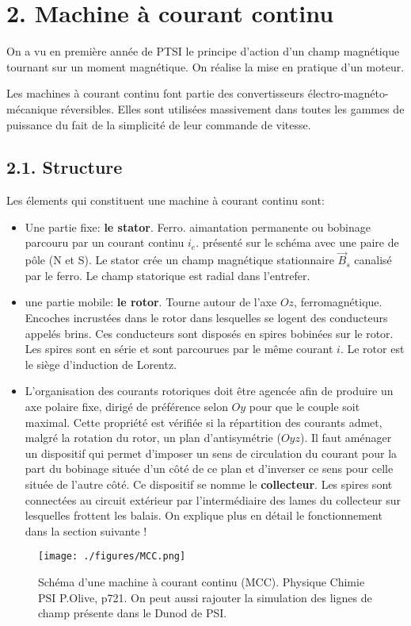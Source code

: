 \documentclass[french, a4paper, 10pt, twocolumn, landscape]{article}
\begin{document}
\section*{2. Machine à courant continu}
On a vu en première année de PTSI le principe d'action d'un champ magnétique tournant sur un moment magnétique. On réalise la mise en pratique d'un moteur.\medskip

Les machines à courant continu font partie des convertisseurs électro-magnéto-mécanique réversibles. Elles sont utilisées massivement dans toutes les gammes de puissance du fait de la simplicité de leur commande de vitesse.

\subsection*{2.1. Structure}

Les élements qui constituent une machine à courant continu sont: 
\begin{itemize}
	\item Une partie fixe: \textbf{le stator}. Ferro. aimantation permanente ou bobinage parcouru par un courant continu $i_e$. présenté sur le schéma avec une paire de pôle (N et S). Le stator crée un champ magnétique stationnaire $\vec{B}_s$ canalisé par le ferro. Le champ statorique est radial dans l'entrefer.
	
	\item une partie mobile: \textbf{le rotor}. Tourne autour de l'axe $Oz$, ferromagnétique. Encoches incrustées dans le rotor dans lesquelles se logent des conducteurs appelés \og{}brins\fg{}. Ces conducteurs sont disposés en spires bobinées sur le rotor. Les spires sont en série et sont parcourues par le même courant $i$. Le rotor est le siège d'induction de Lorentz.
	
	\item L'organisation des courants rotoriques doit être agencée afin de produire un axe polaire fixe, dirigé de préférence selon $Oy$ pour que le couple soit maximal. Cette propriété est vérifiée si la répartition des courants admet, malgré la rotation du rotor, un plan d'antisymétrie ($Oyz$). Il faut aménager un dispositif qui permet d'imposer un sens de circulation du courant pour la part du bobinage située d'un côté de ce plan et d'inverser ce sens pour celle située de l'autre côté. Ce dispositif se nomme le \textbf{collecteur}. Les spires sont connectées au circuit extérieur par l'intermédiaire des lames du collecteur sur lesquelles frottent les balais. On explique plus en détail le fonctionnement dans la section suivante !
\end{itemize}
\begin{figure}[ht]
	\centering
	\texttt{[image: ./figures/MCC.png]}
	\caption{Schéma d'une machine à courant continu (MCC). Physique Chimie PSI P.Olive, p721. On peut aussi rajouter la simulation des lignes de champ présente dans le Dunod de PSI.}
\end{figure}
\end{document}
